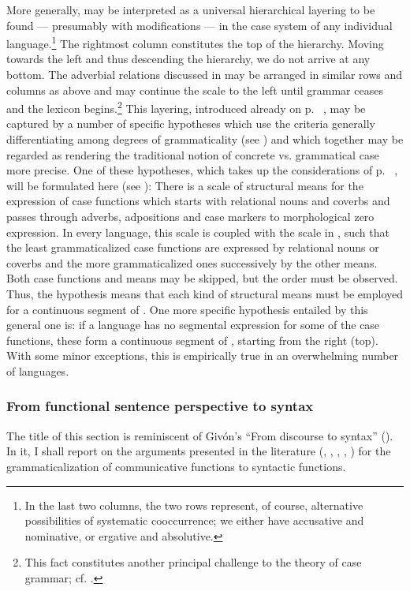 \noindent\label{page120}More generally,  may be interpreted as a universal hierarchical layering to be found — presumably with modifications — in the case system of any individual language.\footnote{In the last two columns, the two rows represent, of course, alternative possibilities of systematic cooccurrence; we either have accusative and nominative, or ergative and absolutive.} The rightmost column constitutes the top of the hierarchy. Moving towards the left and thus descending the hierarchy, we do not arrive at any bottom. The adverbial relations discussed in  may be arranged in similar rows and columns as above and may continue the scale to the left until grammar ceases and the lexicon begins.\footnote{This fact constitutes another principal challenge to the theory of case grammar; cf. \citet[76f]{Dillon1977}.} This layering, introduced already on p.~\pageref{page102}\chk%
, may be captured by a number of specific hypotheses which use the criteria generally differentiating among degrees of grammaticality (see ) and which together may be regarded as rendering the traditional notion of concrete vs. grammatical case more precise. One of these hypotheses, which takes up the considerations of p.~\pageref{page102}\chk%
 , will be formulated here (see \citealt[§4]{Lehmann1983}): There is a scale of structural means for the expression of case functions which starts with relational nouns and coverbs and passes through adverbs, adpositions and case markers to morphological zero expression. In every language, this scale is coupled with the scale in , such that the least grammaticalized case functions are expressed by relational nouns or coverbs and the more grammaticalized ones successively by the other means. Both case functions and means may be skipped, but the order must be observed. Thus, the hypothesis means that each kind of structural means must be employed for a continuous segment of . One more specific hypothesis entailed by this general one is: if a language has no segmental expression for some of the case functions, these form a continuous segment of , starting from the right (top). With some minor exceptions, this is empirically true in an overwhelming number of languages.

 
\subsubsection{From functional sentence perspective to syntax} \label{sec:3.4.2.3}
The title of this section is reminiscent of Givón's “From discourse to syntax” (\citeyear{Givón1979}). In it, I shall report on the arguments presented in the literature (\citealt{LiEtAl1976}, \citealt{Sankoff1977}, \citealt{Hagège1978}, \citealt{Givón1979}, \citealt{Vincent1980a}) for the grammaticalization of communicative functions to syntactic functions.

